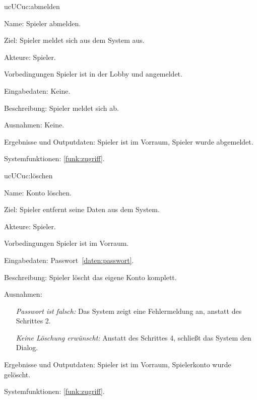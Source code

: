 \begin{description}[leftmargin=5em, style=sameline]
	
		\begin{lhp}{uc}{UC}{uc:abmelden}
		\item [Name:] Spieler abmelden.
		\item [Ziel:] Spieler meldet sich aus dem System aus.
		\item [Akteure:] Spieler.
		\item [Vorbedingungen] Spieler ist in der Lobby und angemeldet.
		\item [Eingabedaten:] Keine.
		\item [Beschreibung:] Spieler meldet sich ab.
		\item [Ausnahmen:] Keine.
		\item [Ergebnisse und Outputdaten:] Spieler ist im Vorraum, Spieler wurde abgemeldet.	
		\item [Systemfunktionen:] \ref{funk:zugriff}.
	\end{lhp}
	
	
	\begin{lhp}{uc}{UC}{uc:löschen}
		\item [Name:] Konto löschen.
		\item [Ziel:] Spieler entfernt seine Daten aus dem System.
		\item [Akteure:] Spieler.
		\item [Vorbedingungen] Spieler ist im Vorraum.
		\item [Eingabedaten:] Passwort~\ref{daten:passwort}.
		\item [Beschreibung:] Spieler löscht das eigene Konto komplett.
		\item [Ausnahmen:] \hfill
			\begin{itemize} 
			\item[] \textit{Passwort ist falsch:} Das System zeigt eine Fehlermeldung an, anstatt des Schrittes 2.
			\item[] \textit{Keine Löschung erwünscht:} Anstatt des Schrittes 4, schließt das System den Dialog.				
			\end{itemize}
		\item [Ergebnisse und Outputdaten:] Spieler ist im Vorraum, Spielerkonto wurde gelöscht.	
		\item [Systemfunktionen:] \ref{funk:zugriff}.
	\end{lhp}


\end{description}

